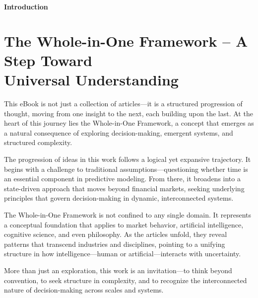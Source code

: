 \documentclass[a4]{article}
\newcommand{\bn}{\bigskip\noindent}
\newcommand{\mn}{\medskip\noindent}
\begin{document}
\mn
{\huge\bf Introduction}


\section*{The Whole-in-One Framework -- A Step Toward\\ Universal Understanding}

This eBook is not just a collection of articles---it is a structured progression of thought, moving from one insight to the next, each building upon the last. At the heart of this journey lies the Whole-in-One Framework, a concept that emerges as a natural consequence of exploring decision-making, emergent systems, and structured complexity.  

\bn
The progression of ideas in this work follows a logical yet expansive trajectory. It begins with a challenge to traditional assumptions---questioning whether time is an essential component in predictive modeling. From there, it broadens into a state-driven approach that moves beyond financial markets, seeking underlying principles that govern decision-making in dynamic, interconnected systems.  

\bn
The Whole-in-One Framework is not confined to any single domain. It represents a conceptual foundation that applies to market behavior, artificial intelligence, cognitive science, and even philosophy. As the articles unfold, they reveal patterns that transcend industries and disciplines, pointing to a unifying structure in how intelligence---human or artificial---interacts with uncertainty.  

\bn
More than just an exploration, this work is an invitation---to think beyond convention, to seek structure in complexity, and to recognize the interconnected nature of decision-making across scales and systems.  
\end{document}
